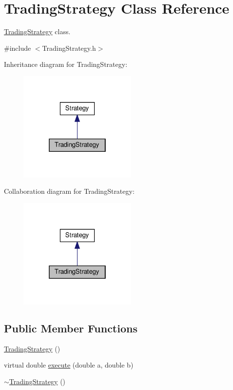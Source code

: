 \hypertarget{classTradingStrategy}{}\section{Trading\+Strategy Class Reference}
\label{classTradingStrategy}


\hyperlink{classTradingStrategy}{Trading\+Strategy} class.  




{\ttfamily \#include $<$Trading\+Strategy.\+h$>$}



Inheritance diagram for Trading\+Strategy\+:
\nopagebreak
\begin{figure}[H]
\begin{center}
\leavevmode
\includegraphics[width=166pt]{classTradingStrategy__inherit__graph}
\end{center}
\end{figure}


Collaboration diagram for Trading\+Strategy\+:
\nopagebreak
\begin{figure}[H]
\begin{center}
\leavevmode
\includegraphics[width=166pt]{classTradingStrategy__coll__graph}
\end{center}
\end{figure}
\subsection*{Public Member Functions}
\begin{DoxyCompactItemize}
\item 
\hyperlink{classTradingStrategy_a26f088c714200a67a248591fc2023a20}{Trading\+Strategy} ()
\item 
virtual double \hyperlink{classTradingStrategy_a4029029df708f9f0f013603b19f449ff}{execute} (double a, double b)
\item 
\hyperlink{classTradingStrategy_aab4c9c86553ad820ccc52fda3412d32b}{$\sim$\+Trading\+Strategy} ()
\end{DoxyCompactItemize}


